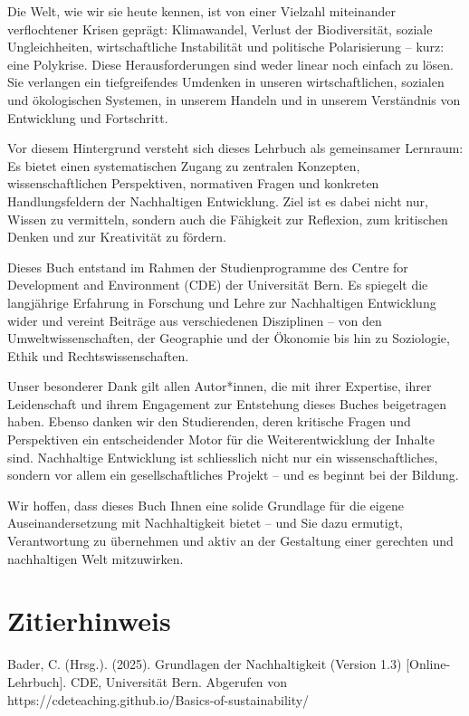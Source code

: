 \documentclass[
  nswissgerman,
  a4paper,
  openany]{book}
\begin{document}
Die Welt, wie wir sie heute kennen, ist von einer Vielzahl miteinander
verflochtener Krisen geprägt: Klimawandel, Verlust der Biodiversität,
soziale Ungleichheiten, wirtschaftliche Instabilität und politische
Polarisierung -- kurz: eine Polykrise. Diese Herausforderungen sind
weder linear noch einfach zu lösen. Sie verlangen ein tiefgreifendes
Umdenken in unseren wirtschaftlichen, sozialen und ökologischen
Systemen, in unserem Handeln und in unserem Verständnis von Entwicklung
und Fortschritt.

Vor diesem Hintergrund versteht sich dieses Lehrbuch als gemeinsamer
Lernraum: Es bietet einen systematischen Zugang zu zentralen Konzepten,
wissenschaftlichen Perspektiven, normativen Fragen und konkreten
Handlungsfeldern der Nachhaltigen Entwicklung. Ziel ist es dabei nicht
nur, Wissen zu vermitteln, sondern auch die Fähigkeit zur Reflexion, zum
kritischen Denken und zur Kreativität zu fördern.

Dieses Buch entstand im Rahmen der Studienprogramme des Centre for
Development and Environment (CDE) der Universität Bern. Es spiegelt die
langjährige Erfahrung in Forschung und Lehre zur Nachhaltigen
Entwicklung wider und vereint Beiträge aus verschiedenen Disziplinen --
von den Umweltwissenschaften, der Geographie und der Ökonomie bis hin zu
Soziologie, Ethik und Rechtswissenschaften.

Unser besonderer Dank gilt allen Autor*innen, die mit ihrer Expertise,
ihrer Leidenschaft und ihrem Engagement zur Entstehung dieses Buches
beigetragen haben. Ebenso danken wir den Studierenden, deren kritische
Fragen und Perspektiven ein entscheidender Motor für die
Weiterentwicklung der Inhalte sind. Nachhaltige Entwicklung ist
schliesslich nicht nur ein wissenschaftliches, sondern vor allem ein
gesellschaftliches Projekt -- und es beginnt bei der Bildung.

Wir hoffen, dass dieses Buch Ihnen eine solide Grundlage für die eigene
Auseinandersetzung mit Nachhaltigkeit bietet -- und Sie dazu ermutigt,
Verantwortung zu übernehmen und aktiv an der Gestaltung einer gerechten
und nachhaltigen Welt mitzuwirken.

\section*{Zitierhinweis}\label{zitierhinweis}


Bader, C. (Hrsg.). (2025). Grundlagen der Nachhaltigkeit (Version 1.3)
{[}Online-Lehrbuch{]}. CDE, Universität Bern. Abgerufen von
https://cdeteaching.github.io/Basics-of-sustainability/
\end{document}
